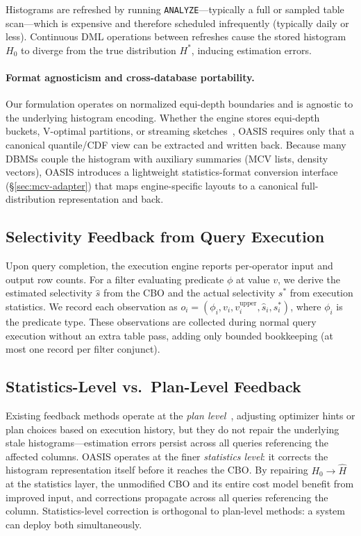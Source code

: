 \documentclass[runningheads]{llncs}
\begin{document}
Histograms are refreshed by running \texttt{ANALYZE}---typically a full or sampled
table scan---which is expensive and therefore scheduled infrequently (typically daily or less).
Continuous DML operations between refreshes cause the stored histogram $H_0$
to diverge from the true distribution $H^*$, inducing estimation errors.
\paragraph{Format agnosticism and cross-database portability.}
Our formulation operates on normalized equi-depth boundaries and is agnostic to the underlying histogram encoding. Whether the engine stores equi-depth buckets, V-optimal partitions, or streaming sketches~\cite{ivkin2019kll}, OASIS requires only that a canonical quantile/CDF view can be extracted and written back. Because many DBMSs couple the histogram with auxiliary summaries (MCV lists, density vectors), OASIS introduces a lightweight statistics-format conversion interface (\S\ref{sec:mcv-adapter}) that maps engine-specific layouts to a canonical full-distribution representation and back.

\subsection{Selectivity Feedback from Query Execution}

Upon query completion, the execution engine reports per-operator input and output row counts. For a filter evaluating predicate $\phi$ at value $v$, we derive the estimated selectivity $\hat{s}$ from the CBO and the actual selectivity $s^*$ from execution statistics. We record each observation as $o_i = (\phi_i, v_i, v_i^{\text{upper}}, \hat{s}_i, s^*_i)$, where $\phi_i$ is the predicate type. These observations are collected during normal query execution without an extra table pass, adding only bounded bookkeeping (at most one record per filter conjunct).

\subsection{Statistics-Level vs.\ Plan-Level Feedback}
\label{sec:two_levels}

Existing feedback methods operate at the \emph{plan level}~\cite{stillger2001leo,marcus2019neo,marcus2022bao}, adjusting optimizer hints or plan choices based on execution history, but they do not repair the underlying stale histograms—estimation errors persist across all queries referencing the affected columns.
OASIS operates at the finer \emph{statistics level}: it corrects the histogram representation itself before it reaches the CBO. By repairing $H_0 \to \hat{H}$ at the statistics layer, the unmodified CBO and its entire cost model benefit from improved input, and corrections propagate across all queries referencing the column.
Statistics-level correction is orthogonal to plan-level methods: a system can deploy both simultaneously.
\end{document}
